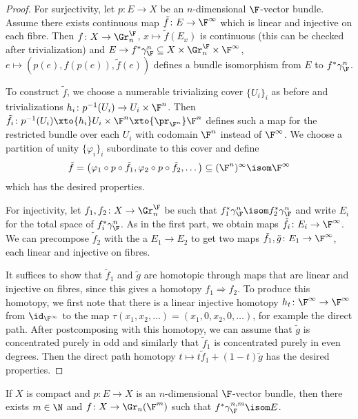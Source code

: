 \begin{proof}
	For surjectivity, let $p\colon E \to X$ be an $n$-dimensional $\F$-vector bundle.
	Assume there exists continuous map $\tilde{f}\colon E \to \F^\infty$ which is linear and injective on each fibre.
	Then $f\colon X \to \Gr_n^{\F}$, $x \mapsto \tilde{f}(E_x)$ is continuous (this can be checked after trivialization) and $E \to f^* \gamma_{\F}^n \subseteq X \times \Gr_n^{\F} \times \F^\infty$, $e \mapsto (p(e), f(p(e)), \tilde{f}(e))$ defines a bundle isomorphism from $E$ to $f^* \gamma_{\F}^n$.

	To construct $\tilde{f}$, we choose a numerable trivializing cover $\{U_i\}_i$ as before and trivializations $h_i\colon p^{-1}(U_i) \to U_i \times \F^n$.
	Then $\tilde{f}_i\colon p^{-1}(U_i) \xto{h_i} U_i \times \F^n \xto{\pr_{\F^n}} \F^n$ defines such a map for the restricted bundle over each $U_i$ with codomain $\F^n$ instead of $\F^\infty$.
	We choose a partition of unity $\{\varphi_i\}_i$ subordinate to this cover and define
	\begin{equation*}
		\tilde{f} = \big(\varphi_1 \circ p \circ \tilde{f}_1, \varphi_2 \circ p \circ \tilde{f}_2, \ldots\big) \subseteq (\F^n)^\infty \isom \F^\infty
	\end{equation*}
	which has the desired properties.

	For injectivity, let $f_1, f_2\colon X \to \Gr^{\F}_n$ be such that $f_1^* \gamma_{\F}^n \isom f_2^* \gamma_{\F}^n$ and write $E_i$ for the total space of $f_i^* \gamma_{\F}^n$.
	As in the first part, we obtain maps $\tilde{f}_i\colon E_i \to \F^\infty$.
	We can precompose $\tilde{f}_2$ with the a $E_1 \to E_2$ to get two maps $\tilde{f}_1, \tilde{g}\colon E_1 \to \F^\infty$, each linear and injective on fibres.

	It suffices to show that $\tilde{f}_1$ and $\tilde{g}$ are homotopic through maps that are linear and injective on fibres, since this gives a homotopy $f_1 \Rightarrow f_2$.
	To produce this homotopy, we first note that there is a linear injective homotopy $h_t\colon \F^\infty \to \F^\infty$ from $\id_{\F^\infty}$ to the map $\tau(x_1, x_2, \ldots) = (x_1, 0, x_2, 0, \ldots)$, for example the direct path.
	After postcomposing with this homotopy, we can assume that $\tilde{g}$ is concentrated purely in odd and similarly that $\tilde{f}_1$ is concentrated purely in even degrees.
	Then the direct path homotopy $t \mapsto t \tilde{f}_1 + (1 - t) \tilde{g}$ has the desired properties.
\end{proof}
\begin{corollary}
	If $X$ is compact and $p\colon E \to X$ is an $n$-dimensional $\F$-vector bundle, then there exists $m \in \N$ and $f\colon X \to \Gr_n(\F^m)$ such that $f^* \gamma_{\F}^{n, m} \isom E$. 
\end{corollary}

